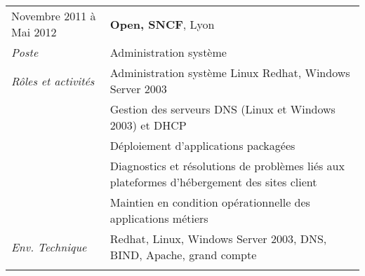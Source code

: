 \documentclass[a4paper]{article}
\begin{document}
\begin{tabular}{P{3.5cm}|p{13cm}}
Novembre 2011 à Mai 2012	& \textbf{Open, SNCF}, Lyon\\
\textsl{Poste}			& Administration système\\
\textsl{Rôles et activités} 	& Administration système Linux Redhat, Windows Server 2003\\
				& Gestion des serveurs DNS (Linux et Windows 2003) et DHCP\\
				& Déploiement d'applications packagées\\
				& Diagnostics et résolutions de problèmes liés aux plateformes d'hébergement des sites client\\
				& Maintien en condition opérationnelle des applications métiers\\
\textsl{Env. Technique}		& Redhat, Linux, Windows Server 2003, DNS, BIND, Apache, grand compte\\
 & \\
\end{tabular}
\end{document}
